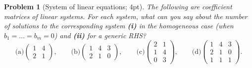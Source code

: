 \documentclass[12pt,a4]{article}
\newtheorem{problem}{Problem}
\begin{document}
\begin{problem}[System of linear equations; 4pt]\rm
	The following are coefficient matrices of linear systems. For each system, what can you say about the number of solutions to the corresponding system \textbf{(i)} in the homogeneous case (when $b_1 = \dots =b_m =0$) and \textbf{(ii)} for a generic RHS?
	\[
	\textrm{(a)}\begin{pmatrix}
		1 &   4 \\ 2 & 1
		\end{pmatrix},
	\qquad
	\textrm{(b)}\begin{pmatrix}
		1 &  4  & 3\\ 2 & 1 & 0
		\end{pmatrix},
	\qquad
	\textrm{(c)}\begin{pmatrix}
		2 & 1 \\ 1 &  4 \\ 0 & 3
		\end{pmatrix},
	\qquad
	\textrm{(d)}\begin{pmatrix}
		1 & 4 & 3 \\ 2 & 1 & 0 \\ 1 & 1 & 1
		\end{pmatrix}.
	\]
\end{problem}
\end{document}

